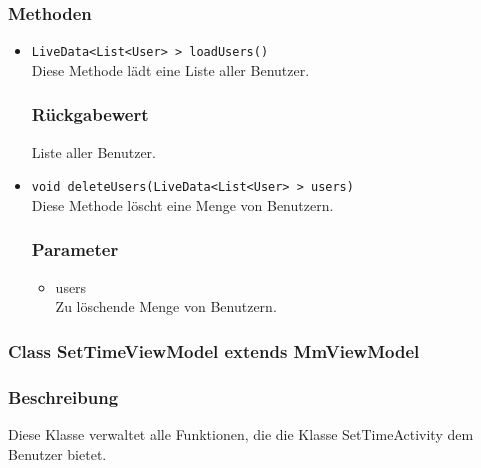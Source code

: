 \documentclass[a4paper]{scrreprt}
\begin{document}
\subsubsection*{Methoden}
\begin{addmargin}[25pt]{0pt}
\begin{itemize}

\item \texttt{LiveData<List<User> > loadUsers()}\\
	Diese Methode lädt eine Liste aller Benutzer.

	\subsubsection*{Rückgabewert}
	Liste aller Benutzer.

\item \texttt{void deleteUsers(LiveData<List<User> > users)}\\
Diese Methode löscht eine Menge von Benutzern.
	\subsubsection*{Parameter}
	\begin{itemize}
	\item users \\
		Zu löschende Menge von Benutzern.
	\end{itemize}

\end{itemize}
\end{addmargin}


\subsubsection{Class SetTimeViewModel extends MmViewModel}
\subsubsection*{Beschreibung}
Diese Klasse verwaltet alle Funktionen, die die Klasse SetTimeActivity dem Benutzer bietet.
\end{document}

